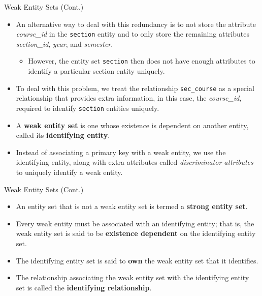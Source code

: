\documentclass{beamer}
\begin{document}
\begin{frame}{Weak Entity Sets (Cont.)}
    \begin{itemize}
        \item An alternative way to deal with this redundancy is to not store the attribute \textit{course\_id} in the \texttt{section} entity and to only store the remaining attributes \textit{section\_id}, \textit{year}, and \textit{semester}.
        \begin{itemize}
            \item However, the entity set \texttt{section} then does not have enough attributes to identify a particular section entity uniquely.
        \end{itemize}
        \item To deal with this problem, we treat the relationship \texttt{sec\_course} as a special relationship that provides extra information, in this case, the \textit{course\_id}, required to identify \texttt{section} entities uniquely.
        \item A \textbf{weak entity set} is one whose existence is dependent on another entity, called its \textbf{identifying entity}.
        \item Instead of associating a primary key with a weak entity, we use the identifying entity, along with extra attributes called \textit{discriminator attributes} to uniquely identify a weak entity.
    \end{itemize}
\end{frame}

\begin{frame}{Weak Entity Sets (Cont.)}
    \begin{itemize}
        \item An entity set that is not a weak entity set is termed a \textbf{strong entity set}.
        \item Every weak entity must be associated with an identifying entity; that is, the weak entity set is said to be \textbf{existence dependent} on the identifying entity set.
        \item The identifying entity set is said to \textbf{own} the weak entity set that it identifies.
        \item The relationship associating the weak entity set with the identifying entity set is called the \textbf{identifying relationship}.
    \end{itemize}
\end{frame}
\end{document}
